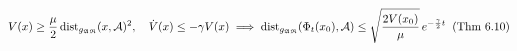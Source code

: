 \documentclass[preview]{standalone}
\begin{document}
\begin{align*}
\special{dvisvgm:raw <g id='unique000'>}V(x) \ge \frac{\mu}{2}\operatorname{dist}_{g_{\mathfrak{AR}}}(x,\mathcal{A})^2, \quad \dot{V}(x) \le -\gamma V(x) \;\Longrightarrow\; \operatorname{dist}_{g_{\mathfrak{AR}}}(\Phi_t(x_0),\mathcal{A}) \le \sqrt{\frac{2V(x_0)}{\mu}}\,e^{-\frac{\gamma}{2}t}\;\;(\text{Thm 6.10})\special{dvisvgm:raw </g>}
\end{align*}
\end{document}
